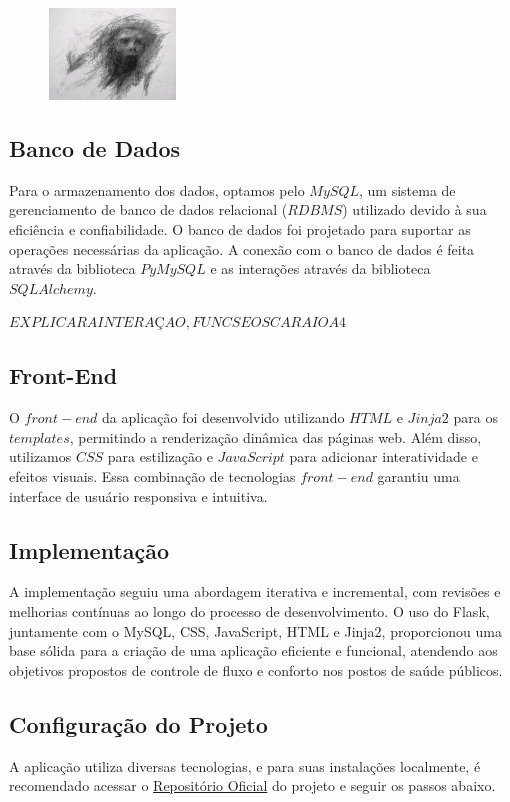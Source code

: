 \documentclass[conference, a4paper, 12pt]{IEEEtran}
\begin{document}
\begin{figure}[h]
  \begin{center}
    \includegraphics[width=0.30\textwidth]{schizo.jpeg}
  \end{center}
\end{figure}

\subsection{Banco de Dados}
Para o armazenamento dos dados, optamos pelo $MySQL$, um sistema de gerenciamento de banco de dados relacional ($RDBMS$) utilizado devido à sua eficiência e confiabilidade. O banco de dados foi projetado para suportar as operações necessárias da aplicação. A conexão com o banco de dados é feita através da biblioteca $PyMySQL$ e as interações através da biblioteca $SQLAlchemy$.  

$EXPLICAR A INTERAÇAO, FUNCS E OS CARAIO A 4$

\subsection{Front-End}
O $front-end$ da aplicação foi desenvolvido utilizando $HTML$ e $Jinja2$ para os $templates$, permitindo a renderização dinâmica das páginas web. Além disso, utilizamos $CSS$ para estilização e $JavaScript$ para adicionar interatividade e efeitos visuais. Essa combinação de tecnologias $front-end$ garantiu uma interface de usuário responsiva e intuitiva.

\subsection{Implementação}
A implementação seguiu uma abordagem iterativa e incremental, com revisões e melhorias contínuas ao longo do processo de desenvolvimento. O uso do Flask, juntamente com o MySQL, CSS, JavaScript, HTML e Jinja2, proporcionou uma base sólida para a criação de uma aplicação eficiente e funcional, atendendo aos objetivos propostos de controle de fluxo e conforto nos postos de saúde públicos.

\subsection{Configuração do Projeto}
A aplicação utiliza diversas tecnologias, e para suas instalações localmente, é recomendado acessar o \href{https://github.com/Lucas-PG/flask_app_healthcare}{Repositório Oficial} do projeto e seguir os passos abaixo. 
\end{document}
